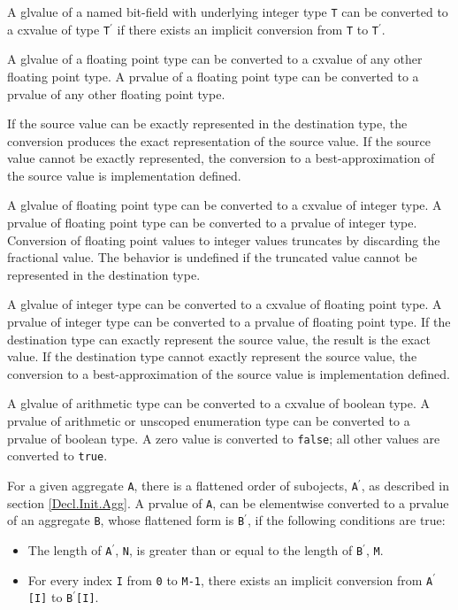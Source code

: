 \p A glvalue of a named bit-field with underlying integer type \texttt{T} can be
converted to a cxvalue of type \texttt{T$^\prime$} if there exists an implicit
conversion from \texttt{T} to \texttt{T$^\prime$}.


\p A glvalue of a floating point type can be converted to a cxvalue of any other
floating point type. A prvalue of a floating point type can be converted to a
prvalue of any other floating point type.

\p If the source value can be exactly represented in the destination type, the
conversion produces the exact representation of the source value. If the source
value cannot be exactly represented, the conversion to a best-approximation of
the source value is implementation defined.


\p A glvalue of floating point type can be converted to a cxvalue of integer
type. A prvalue of floating point type can be converted to a prvalue of
integer type. Conversion of floating point values to integer values truncates by
discarding the fractional value. The behavior is undefined if the truncated
value cannot be represented in the destination type.

\p A glvalue of integer type can be converted to a cxvalue of floating point
type. A prvalue of integer type can be converted to a prvalue of floating
point type. If the destination type can exactly represent the source value, the
result is the exact value. If the destination type cannot exactly represent the
source value, the conversion to a best-approximation of the source value is
implementation defined.


\p A glvalue of arithmetic type can be converted to a cxvalue of boolean type. A
prvalue of arithmetic or unscoped enumeration type can be converted to a prvalue
of boolean type. A zero value is converted to \texttt{false}; all other values
are converted to \texttt{true}.


\p For a given aggregate \texttt{A}, there is a flattened order of subojects, \texttt{A$^\prime$},
as described in section \ref{Decl.Init.Agg}.  A prvalue of \texttt{A}, can be
elementwise converted to a prvalue of an aggregate \texttt{B}, whose flattened
form is \texttt{B$^\prime$}, if the following conditions are true: 
\begin{itemize}
\item The length of \texttt{A$^\prime$}, \texttt{N}, is greater than or equal to the
length of \texttt{B$^\prime$}, \texttt{M}.
\item For every index \texttt{I} from \texttt{0} to \texttt{M-1}, there exists an
implicit conversion from \texttt{A$^\prime$[I]} to \texttt{B$^\prime$[I]}.
\end{itemize}

